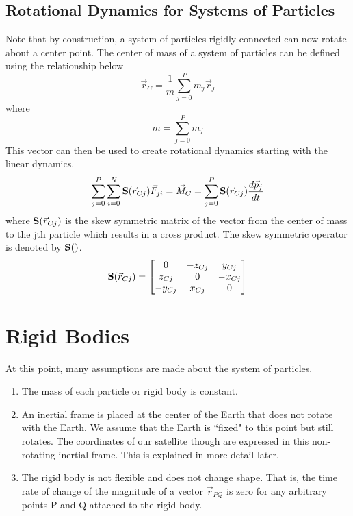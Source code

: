 \documentclass{article}
\begin{document}
\subsection{Rotational Dynamics for Systems of Particles}

Note that by construction, a system of particles rigidly connected can
now rotate about a center point. The center of mass of a system of
particles can be defined using the relationship below
\begin{equation}
\vec{r}_C = \frac{1}{m}\sum\limits_{j=0}^P m_j\vec{r}_{j}
\end{equation}
where
\begin{equation}
m = \sum\limits_{j=0}^P m_j
\end{equation}
This vector can then be used to create rotational dynamics starting
with the linear dynamics.
\begin{equation}
\sum\limits_{j=0}^P \sum\limits_{i=0}^N {\bf S}(\vec{r}_{Cj}) \vec{F}_{ji}  = \vec{M}_C = \sum\limits_{j=0}^P {\bf
  S}(\vec{r}_{Cj}) \frac{d\vec{p}_j}{dt}
\end{equation}
where ${\bf S}(\vec{r}_{Cj})$ is the skew symmetric matrix of the
vector from the center of mass to the jth particle which results in a
cross product. The skew symmetric operator is denoted by ${\bf
  S}()$. 
\begin{equation}
{\bf S}(\vec{r}_{Cj}) = \begin{bmatrix} 0 & -z_{Cj} & y_{Cj} \\ z_{Cj} & 0 &
  -x_{Cj} \\ -y_{Cj} & x_{Cj} & 0 \end{bmatrix}
\end{equation}
\section{Rigid Bodies}
At this point, many assumptions are made about the
system of particles.
\begin{enumerate}
\item The mass of each particle or rigid body is constant.
\item An inertial frame is placed at the center of the Earth that does
  not rotate with the Earth. We assume that the Earth is ``fixed" to
  this point but still rotates. The coordinates of our satellite
  though are expressed in this non-rotating inertial frame. This is
  explained in more detail later.
\item The rigid body is not flexible and does not change shape. That
  is, the time rate of change of the magnitude of a vector
  $\vec{r}_{PQ}$ is zero for any arbitrary points P and Q attached to
  the rigid body.
\end{enumerate}
\end{document}
